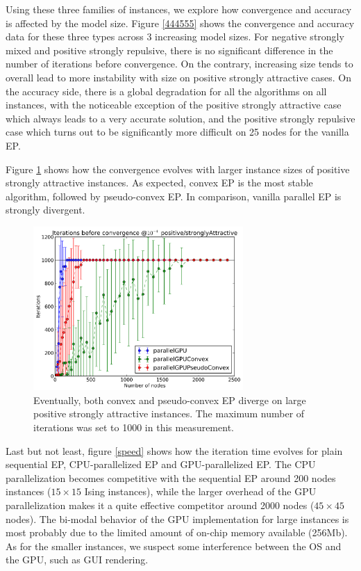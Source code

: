 \documentclass[times, 10pt,twocolumn]{article}
\begin{document}
Using these three families of instances, we explore how convergence and accuracy is affected by the model size. Figure \ref{444555} shows the convergence and accuracy data for these three types across 3 increasing model sizes. For negative strongly mixed and positive strongly repulsive, there is no significant difference in the number of iterations before convergence. On the contrary, increasing size tends to overall lead to more instability with size on positive strongly attractive cases. On the accuracy side, there is a global degradation for all the algorithms on all instances, with the noticeable exception of the positive strongly attractive case which always leads to a very accurate solution, and the positive strongly repulsive case which turns out to be significantly more difficult on 25 nodes for the vanilla EP.

Figure \ref{asympt} shows how the convergence evolves with larger instance sizes of positive strongly attractive instances. As expected, convex EP is the most stable algorithm, followed by pseudo-convex EP. In comparison, vanilla parallel EP is strongly divergent.

\begin{figure}[h!]\centering
	\includegraphics[width=8cm]{plots/sizes/Iterations_before_convergence_e-4_positive_stronglyAttractive.png}
	\caption{Eventually, both convex and pseudo-convex EP diverge on large positive strongly attractive instances. The maximum number of iterations was set to 1000 in this measurement.}
	\label{asympt}
\end{figure}

Last but not least, figure \ref{speed} shows how the iteration time evolves for plain sequential EP, CPU-parallelized EP and GPU-parallelized EP. The CPU parallelization becomes competitive with the sequential EP around 200 nodes instances ($15 \times 15$ Ising instances), while the larger overhead of the GPU parallelization makes it a quite effective competitor around 2000 nodes ($45 \times 45$ nodes). The bi-modal behavior of the GPU implementation for large instances is most probably due to the limited amount of on-chip memory available (256Mb). As for the smaller instances, we suspect some interference between the OS and the GPU, such as GUI rendering.
\end{document}
